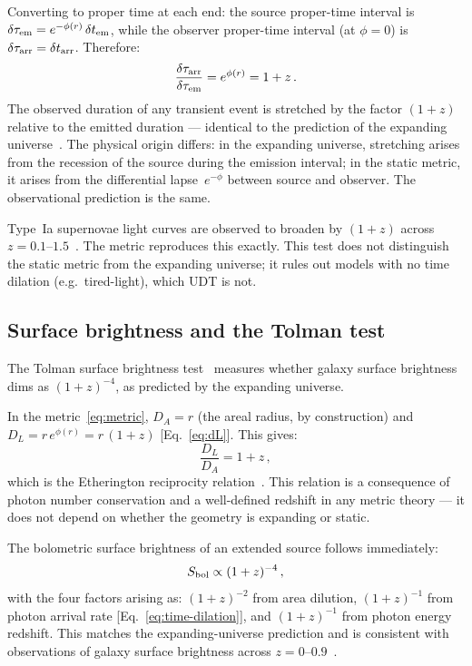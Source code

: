 \documentclass[aps,prd,twocolumn,superscriptaddress,nofootinbib,longbibliography]{revtex4-2}
\begin{document}
Converting to proper time at each end: the source proper-time interval
is $\delta\tau_{\rm em} = e^{-\phi(r)}\,\delta t_{\rm em}$, while the
observer proper-time interval (at $\phi = 0$) is
$\delta\tau_{\rm arr} = \delta t_{\rm arr}$.  Therefore:
\begin{equation}\label{eq:time-dilation}
  \frac{\delta\tau_{\rm arr}}{\delta\tau_{\rm em}}
    = e^{\phi(r)} = 1 + z\,.
\end{equation}
The observed duration of any transient event is stretched by the
factor $(1+z)$ relative to the emitted duration --- identical to the
prediction of the expanding
universe~\cite{Leibundgut2001,Blondin2008}.  The physical origin
differs: in the expanding universe, stretching arises from the
recession of the source during the emission interval; in the static
metric, it arises from the differential lapse~$e^{-\phi}$ between
source and observer.  The observational prediction is the same.

Type~Ia supernovae light curves are observed to broaden by $(1+z)$
across $z = 0.1$--$1.5$~\cite{Foley2005,Blondin2008}.  The metric
reproduces this exactly.  This test does not distinguish the static
metric from the expanding universe; it rules out models with no time
dilation (e.g.\ tired-light), which UDT is not.

\subsection{Surface brightness and the Tolman test}

The Tolman surface brightness test~\cite{Tolman1930,Lubin2001}
measures whether galaxy surface brightness dims as $(1+z)^{-4}$, as
predicted by the expanding universe.

In the metric~\eqref{eq:metric}, $D_A = r$ (the areal radius, by
construction) and $D_L = r\,e^{\phi(r)} = r\,(1+z)$
[Eq.~\eqref{eq:dL}].  This gives:
\begin{equation}\label{eq:etherington}
  \frac{D_L}{D_A} = 1 + z\,,
\end{equation}
which is the Etherington reciprocity
relation~\cite{Etherington1933}.  This relation is a consequence of
photon number conservation and a well-defined redshift in any metric
theory --- it does not depend on whether the geometry is expanding or
static.

The bolometric surface brightness of an extended source follows
immediately:
\begin{equation}\label{eq:tolman}
  S_{\rm bol} \propto (1+z)^{-4}\,,
\end{equation}
with the four factors arising as: $(1+z)^{-2}$ from area dilution,
$(1+z)^{-1}$ from photon arrival rate
[Eq.~\eqref{eq:time-dilation}], and $(1+z)^{-1}$ from photon energy
redshift.  This matches the expanding-universe prediction and is
consistent with observations of galaxy surface brightness across
$z = 0$--$0.9$~\cite{Lubin2001}.
\end{document}
